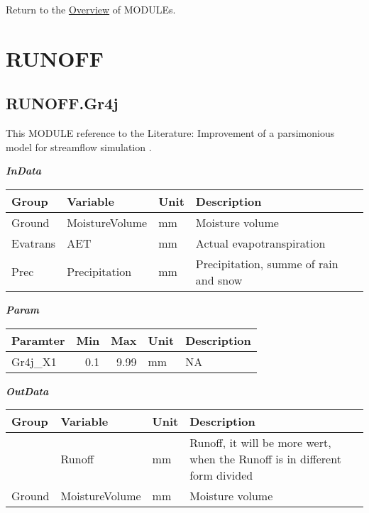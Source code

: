 \documentclass[
]{book}
\begin{document}
Return to the \protect\hyperlink{module}{Overview} of MODULEs.

\hypertarget{RUNOFF}{%
\section{RUNOFF}\label{RUNOFF}}

\hypertarget{RUNOFF.Gr4j}{%
\subsection{RUNOFF.Gr4j}\label{RUNOFF.Gr4j}}

This MODULE reference to the Literature: Improvement of a parsimonious model for streamflow simulation \citep{Perrin.2003}.

\textbf{\emph{InData}}

\begin{table}[!h]
\centering
\begin{tabular}{l|l|l|l}
\hline
Group & Variable & Unit & Description\\
\hline
Ground & MoistureVolume & mm & Moisture volume\\
\cline{1-4}
Evatrans & AET & mm & Actual evapotranspiration\\
\cline{1-4}
Prec & Precipitation & mm & Precipitation, summe of rain and snow\\
\hline
\end{tabular}
\end{table}

\textbf{\emph{Param}}

\begin{table}[!h]
\centering
\begin{tabular}{l|r|r|l|l}
\hline
Paramter & Min & Max & Unit & Description\\
\hline
Gr4j\_X1 & 0.1 & 9.99 & mm & NA\\
\hline
\end{tabular}
\end{table}

\textbf{\emph{OutData}}

\begin{table}[!h]
\centering
\begin{tabular}{l|l|l|l}
\hline
Group & Variable & Unit & Description\\
\hline
 & Runoff & mm & Runoff, it will be more wert, when the Runoff is in different form divided\\
\cline{2-4}
\multirow{-2}{*}{\raggedright\arraybackslash Ground} & MoistureVolume & mm & Moisture volume\\
\hline
\end{tabular}
\end{table}
\end{document}
